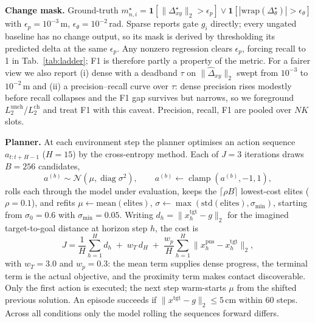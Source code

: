 \documentclass[conference]{IEEEtran}
\begin{document}
\textbf{Change mask.} Ground-truth $m^\star_{n,i}=\mathbf{1}[\lVert\Delta^\star_{xy}\rVert_2>\epsilon_p]\vee\mathbf{1}[|\mathrm{wrap}(\Delta^\star_\theta)|>\epsilon_\theta]$ with $\epsilon_p{=}10^{-3}$\,m, $\epsilon_\theta{=}10^{-2}$\,rad. Sparse reports gate $g_i$ directly; every ungated baseline has no change output, so its mask is derived by thresholding its predicted delta at the same $\epsilon_p$. Any nonzero regression clears $\epsilon_p$, forcing recall to 1 in Tab.~\ref{tab:ladder}; F1 is therefore partly a property of the metric. For a fairer view we also report (i) dense with a deadband $\tau$ on $\lVert\hat\Delta_{xy}\rVert_2$ swept from $10^{-3}$ to $10^{-2}$\,m and (ii) a precision--recall curve over $\tau$: dense precision rises modestly before recall collapses and the F1 gap survives but narrows, so we foreground $L_2^{\text{unch}}$/$L_2^{\text{ch}}$ and treat F1 with this caveat. Precision, recall, F1 are pooled over $NK$ slots.

\textbf{Planner.} At each environment step the planner optimises an action sequence
$a_{t:t+H-1}$ ($H{=}15$) by the cross-entropy method. Each of $J{=}3$ iterations draws
$B{=}256$ candidates,
\begin{equation}
  a^{(b)} \sim \mathcal{N}(\mu,\operatorname{diag}\sigma^2),
  \qquad
  a^{(b)} \leftarrow \operatorname{clamp}\!\left(a^{(b)},-1,1\right),
\end{equation}
rolls each through the model under evaluation, keeps the $\lceil \rho B \rceil$
lowest-cost elites ($\rho{=}0.1$), and refits $\mu \leftarrow \mathrm{mean}(\text{elites})$,
$\sigma \leftarrow \max(\mathrm{std}(\text{elites}),\sigma_{\min})$, starting from
$\sigma_0{=}0.6$ with $\sigma_{\min}{=}0.05$. Writing $d_h = \lVert x^{\text{tgt}}_h - g
\rVert_2$ for the imagined target-to-goal distance at horizon step $h$, the cost is
\begin{equation}
  J = \frac{1}{H}\sum_{h=1}^{H} d_h
    \;+\; w_T\, d_H
    \;+\; \frac{w_p}{H}\sum_{h=1}^{H} \lVert x^{\text{pus}}_h - x^{\text{tgt}}_h \rVert_2 ,
\end{equation}
with $w_T{=}3.0$ and $w_p{=}0.3$: the mean term supplies dense progress, the terminal term
is the actual objective, and the proximity term makes contact discoverable. Only the first
action is executed; the next step warm-starts $\mu$ from the shifted previous solution. An
episode succeeds if $\lVert x^{\text{tgt}} - g \rVert_2 \le 5$\,cm within 60 steps. Across
all conditions only the model rolling the sequences forward differs.
\end{document}
